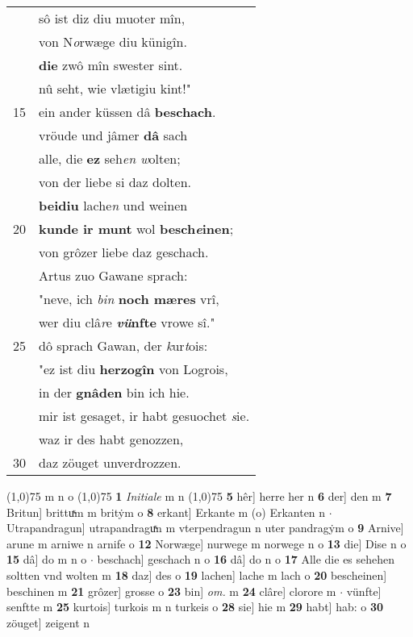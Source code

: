 \documentclass[8pt,a4paper,notitlepage]{article}
\begin{document}
\begin{table}[ht]
\begin{minipage}[t]{0.5\linewidth}
\begin{tabular}{rl}
 & sô ist diz diu muoter mîn,\\ 
 & von N\textit{o}rwæge diu künigîn.\\ 
 & \textbf{die} zwô mîn swester sint.\\ 
 & nû seht, wie vlætigiu kint!"\\ 
15 & ein ander küssen dâ \textbf{beschach}.\\ 
 & vröude und jâmer \textbf{dâ} sach\\ 
 & alle, die \textbf{ez} seh\textit{en w}olten;\\ 
 & von der liebe si daz dolten.\\ 
 & \textbf{beidiu} lache\textit{n} und weinen\\ 
20 & \textbf{kunde ir munt} wol \textbf{besch\textit{e}inen};\\ 
 & von grôzer liebe daz geschach.\\ 
 & Artus zuo Gawane sprach:\\ 
 & "neve, ich \textit{bin} \textbf{noch mæres} vrî,\\ 
 & wer diu clâ\textit{r}e \textbf{\textit{vü}nfte} vrowe sî."\\ 
25 & dô sprach Gawan, der \textit{k}ur\textit{t}ois:\\ 
 & "ez ist diu \textbf{herzogîn} von Logrois,\\ 
 & in der \textbf{gnâden} bin ich hie.\\ 
 & mir ist gesaget, ir habt gesuochet \textit{s}ie.\\ 
 & waz ir des habt genozzen,\\ 
30 & daz zöuget unverdrozzen.\\ 
\end{tabular}
\scriptsize
\line(1,0){75} \newline
m n o \newline
\line(1,0){75} \newline
\textbf{1} \textit{Initiale} m n  \newline
\line(1,0){75} \newline
\textbf{5} hêr] herre her n \textbf{6} der] den m \textbf{7} Britun] brittuͯm m britẏm o \textbf{8} erkant] Erkante m (o) Erkanten n  $\cdot$ Utrapandragun] utrapandraguͯn m vterpendragun n uter pandragẏm o \textbf{9} Arnive] arune m arniwe n arnife o \textbf{12} Norwæge] nurwege m norwege n o \textbf{13} die] Dise n o \textbf{15} dâ] do m n o  $\cdot$ beschach] geschach n o \textbf{16} dâ] do n o \textbf{17} Alle die es sehehen soltten vnd wolten m \textbf{18} daz] des o \textbf{19} lachen] lache m lach o \textbf{20} bescheinen] beschinen m \textbf{21} grôzer] grosse o \textbf{23} bin] \textit{om.} m \textbf{24} clâre] clorore m  $\cdot$ vünfte] senftte m \textbf{25} kurtois] turkois m n turkeis o \textbf{28} sie] hie m \textbf{29} habt] hab: o \textbf{30} zöuget] zeigent n \newline
\end{minipage}
\end{table}
\end{document}
